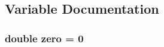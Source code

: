 \subsection{Variable Documentation}
\subsubsection[{\texorpdfstring{zero}{zero}}]{\setlength{\rightskip}{0pt plus 5cm}double zero = 0\hspace{0.3cm}{\ttfamily [static]}}\hypertarget{data-calculator_8cc_a548c77babcdf18ce7b6b96e73fb912cd}{}\label{data-calculator_8cc_a548c77babcdf18ce7b6b96e73fb912cd}

